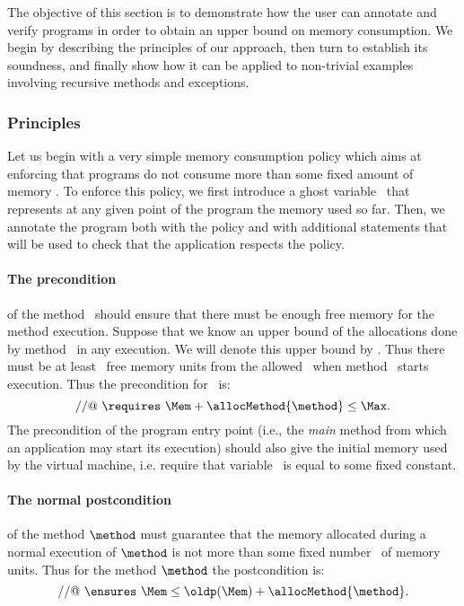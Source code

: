 The objective of this section is to demonstrate how the user can
annotate and verify programs in order to obtain an upper bound on
memory consumption. We begin by describing the principles of our
approach, then turn to establish its soundness, and finally show
how it can be applied to non-trivial examples involving recursive
methods and exceptions.


\subsubsection{Principles}
Let us begin with a very simple memory consumption policy which aims
at enforcing that  programs do not consume more than
some fixed amount of memory \Max . To enforce this policy, we first
introduce a ghost variable \Mem\ that represents at any given point of
the program the memory used so far. Then, we annotate the program both
with the policy and with additional statements that will be used to
check that the application respects the policy.



\paragraph{The precondition} of the method \method\ should ensure
that there must be enough free memory for the method
execution. Suppose that we know an upper bound of the allocations done
by method \method\ in any execution. We will denote this upper
bound by \allocMethod{\method}. Thus there must be at least
\allocMethod{\method}\ free memory units from the allowed \Max\ when
method \method\ starts execution. Thus the precondition for \method\ is:
$$
//@ \ \requires \ \Mem + \allocMethod{\method}  \leq \Max.
$$
The precondition of the program entry point (i.e., the \textit{main} 
method from which an application may start its execution) should 
also give the initial memory used by the virtual machine, i.e.
require that variable \Mem\ is equal to some fixed constant.

\paragraph{The normal postcondition} of the method $\method$ must
guarantee that the memory allocated during a normal execution of
$\method$ is not more than some fixed number \allocMethod{\method}\
of memory units. Thus for the method $\method$ the postcondition is:
$$
//@ \ \ensures \ \Mem \leq \oldp(\Mem) + \allocMethod{\method}.
$$

